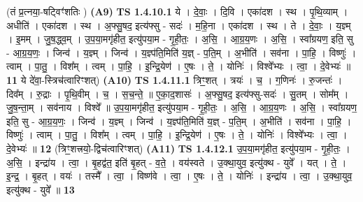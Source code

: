 \documentclass[17pt]{extarticle}
\begin{document}
                  \newline
                      (तं प्र॒त्नया॒-षट्विꣳ॑शतिः )  \textbf{(A9)} \newline \newline
                                \textbf{ TS 1.4.10.1} \newline
                  ये । दे॒वाः॒ । दि॒वि । एका॑दश । स्थ । पृ॒थि॒व्याम् । अधीति॑ । एका॑दश । स्थ । अ॒फ्सु॒षद॒ इत्य॑फ्सु - सदः॑ । म॒हि॒ना । एका॑दश । स्थ । ते । दे॒वाः॒ । य॒ज्ञ्म् । इ॒मम् । जु॒ष॒द्ध्व॒म् । उ॒प॒या॒मगृ॑हीत॒ इत्यु॑पया॒म - गृ॒ही॒तः॒ । अ॒सि॒ । आ॒ग्र॒य॒णः । अ॒सि॒ । स्वा᳚ग्रयण॒ इति॒ सु - आ॒ग्र॒य॒णः॒ । जिन्व॑ । य॒ज्ञ्म् । जिन्व॑ । य॒ज्ञ्प॑ति॒मिति॑ य॒ज्ञ् - प॒ति॒म् । अ॒भीति॑ । सव॑ना । पा॒हि॒ । विष्णुः॑ । त्वाम् । पा॒तु॒ । विश᳚म् । त्वम् । पा॒हि॒ । इ॒न्द्रि॒येण॑ । ए॒षः । ते॒ । योनिः॑ । विश्वे᳚भ्यः । त्वा॒ । दे॒वेभ्यः॑ ॥ \textbf{  11 } \newline
                  \newline
                      ये दे॑वा॒-स्त्रिच॑त्वारिꣳशत्)  \textbf{(A10)} \newline \newline
                                \textbf{ TS 1.4.11.1} \newline
                  त्रिꣳ॒॒शत् । त्रयः॑ । च॒ । ग॒णिनः॑ । रु॒जन्तः॑ । दिव᳚म् । रु॒द्राः । पृ॒थि॒वीम् । च॒ । स॒च॒न्ते॒ ॥ ए॒का॒द॒शासः॑ । अ॒फ्सु॒षद॒ इत्य॑फ्सु-सदः॑ । सु॒तम् । सोम᳚म् । जु॒ष॒न्ता॒म् । सव॑नाय । विश्वे᳚ ॥ उ॒प॒या॒मगृ॑हीत॒ इत्यु॑पया॒म - गृ॒ही॒तः॒ । अ॒सि॒ । आ॒ग्र॒य॒णः । अ॒सि॒ । स्वा᳚ग्रयण॒ इति॒ सु - आ॒ग्र॒य॒णः॒ । जिन्व॑ । य॒ज्ञ्म् । जिन्व॑ । य॒ज्ञ्प॑ति॒मिति॑ य॒ज्ञ् - प॒ति॒म् । अ॒भीति॑ । सव॑ना । पा॒हि॒ । विष्णुः॑ । त्वाम् । पा॒तु॒ । विश᳚म् । त्वम् । पा॒हि॒ । इ॒न्द्रि॒येण॑ । ए॒षः । ते॒ । योनिः॑ । विश्वे᳚भ्यः । त्वा॒ । दे॒वेभ्यः॑ ॥ \textbf{  12} \newline
                  \newline
                      (त्रिꣳ॒॒शत्त्रयो॒-द्विच॑त्वारिꣳशत्)  \textbf{(A11)} \newline \newline
                                \textbf{ TS 1.4.12.1} \newline
                  उ॒प॒या॒मगृ॑हीत॒ इत्यु॑पया॒म - गृ॒ही॒तः॒ । अ॒सि॒ । इन्द्रा॑य । त्वा॒ । बृ॒हद्व॑त॒ इति॑ बृ॒हत् - व॒ते॒ । वय॑स्वते । उ॒क्था॒युव॒ इत्यु॑क्थ - युवे᳚ । यत् । ते॒ । इ॒न्द्र॒ । बृ॒हत् । वयः॑ । तस्मै᳚ । त्वा॒ । विष्ण॑वे । त्वा॒ । ए॒षः । ते॒ । योनिः॑ । इन्द्रा॑य । त्वा॒ । उ॒क्था॒युव॒ इत्यु॑क्थ - युवे᳚ ॥ \textbf{  13} \newline
                  \newline
\end{document}
